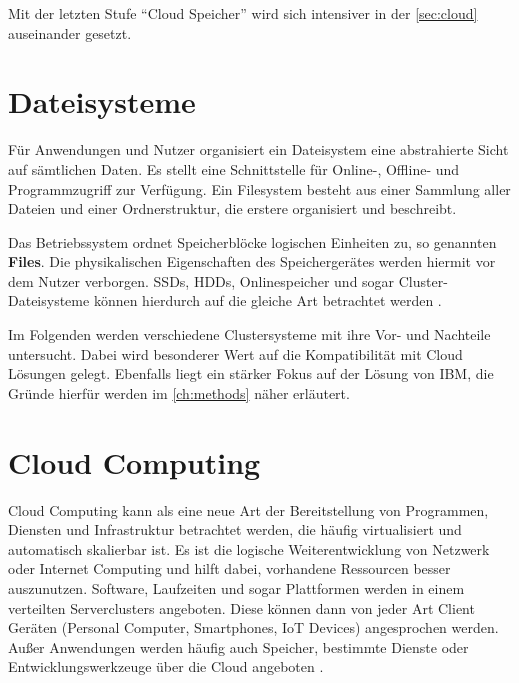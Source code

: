 Mit der letzten Stufe ``Cloud Speicher'' wird sich intensiver in der \autoref{sec:cloud} auseinander gesetzt. 



\newpage

\section{Dateisysteme} \label{sec:filesystems}

Für Anwendungen und Nutzer organisiert ein Dateisystem eine abstrahierte Sicht auf sämtlichen Daten. Es stellt eine Schnittstelle für Online-, Offline- und Programmzugriff zur Verfügung. Ein Filesystem besteht aus einer Sammlung aller Dateien und einer Ordnerstruktur, die erstere organisiert und beschreibt. 

Das Betriebssystem ordnet Speicherblöcke logischen Einheiten zu, so genannten \textbf{Files}. Die physikalischen Eigenschaften des Speichergerätes werden hiermit vor dem Nutzer verborgen. SSDs, HDDs, Onlinespeicher und sogar Cluster-Dateisysteme können hierdurch auf die gleiche Art betrachtet werden \parencite{silberschatz.2012}.

Im Folgenden werden verschiedene Clustersysteme mit ihre Vor- und Nachteile untersucht. Dabei wird besonderer Wert auf die Kompatibilität mit Cloud Lösungen gelegt. Ebenfalls liegt ein stärker Fokus auf der Lösung von IBM, die Gründe hierfür werden im \autoref{ch:methods} näher erläutert.



\section{Cloud Computing}\label{sec:cloud}

Cloud Computing kann als eine neue Art der Bereitstellung von Programmen, Diensten und Infrastruktur betrachtet werden, die häufig virtualisiert und automatisch skalierbar ist. Es ist die logische Weiterentwicklung von Netzwerk oder Internet Computing und hilft dabei, vorhandene Ressourcen besser auszunutzen. 
Software, Laufzeiten und sogar Plattformen werden in einem verteilten Serverclusters angeboten. Diese können dann von jeder Art  Client Geräten (Personal Computer, Smartphones, \ac{IoT} Devices) angesprochen werden. Außer Anwendungen werden häufig  auch Speicher, bestimmte Dienste oder Entwicklungswerkzeuge über die Cloud angeboten \parencite[S. 3]{furth.2010}.

